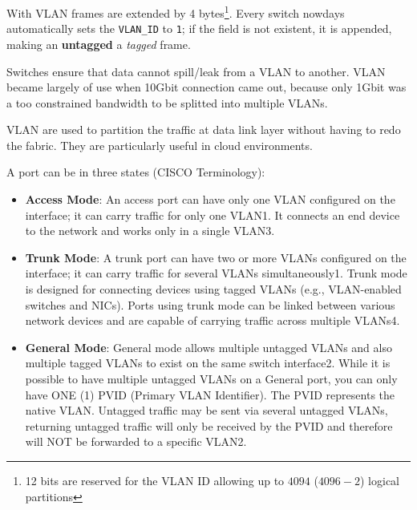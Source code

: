 With VLAN frames are extended by 4 bytes\footnote{12 bits are reserved for the VLAN ID allowing up to $4094$ ($4096-2$) logical partitions}. Every switch nowdays automatically sets the \texttt{VLAN\_ID} to \texttt{1}; if the field is not existent, it is appended, making an \textbf{untagged} a \textit{tagged} frame.

Switches ensure that data cannot spill/leak from a VLAN to another.
VLAN became largely of use when 10Gbit connection came out, because only 1Gbit was a too constrained bandwidth to be splitted into multiple VLANs. 

VLAN are used to partition the traffic at data link layer without having to redo the fabric. They are particularly useful in cloud environments.

A port can be in three states (CISCO Terminology):\ns
\begin{itemize}
   

   \item \textbf{Access Mode}: An access port can have only one VLAN configured on the interface; it can carry traffic for only one VLAN1. It connects an end device to the network and works only in a single VLAN3.

   \item \textbf{Trunk Mode}: A trunk port can have two or more VLANs configured on the interface; it can carry traffic for several VLANs simultaneously1. Trunk mode is designed for connecting devices using tagged VLANs (e.g., VLAN-enabled switches and NICs). Ports using trunk mode can be linked between various network devices and are capable of carrying traffic across multiple VLANs4.

   \item \textbf{General Mode}: General mode allows multiple untagged VLANs and also multiple tagged VLANs to exist on the same switch interface2. While it is possible to have multiple untagged VLANs on a General port, you can only have ONE (1) PVID (Primary VLAN Identifier). The PVID represents the native VLAN. Untagged traffic may be sent via several untagged VLANs, returning untagged traffic will only be received by the PVID and therefore will NOT be forwarded to a specific VLAN2.

   \end{itemize}

